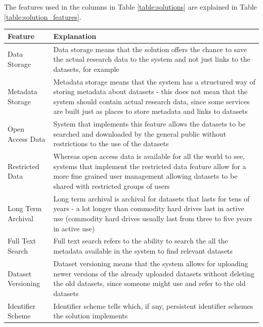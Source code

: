 The features used in the columns in Table \ref{table:solutions} are explained
in Table \ref{table:solution_features}.

\pagebreak

\addtocounter{table}{-1}
\label{table:solution_features}
    \begin{tabularx}{\textwidth}{| >{\raggedright}p{3cm} | X |}
    \hline
    \textbf{Feature} & \textbf{Explanation} \\
    \hline
    \rowcolor{Gray}
    Data Storage    & Data storage means that the solution offers the chance to
                      save the actual research data to the system and not just links
                      to the datasets, for example\\
    \hline
    Metadata Storage &  Metadata storage means that the system has a structured way
                        of storing metadata about datasets - this does not mean that
                        the system should contain actual research data, since some services
                        are built just as places to store metadata and links to datasets\\
    \hline
    \rowcolor{Gray}
    Open Access Data    & System that implements this feature allows the datasets to be searched
                          and downloaded by the general public without restrictions to the use
                          of the datasets\\
    \hline
    Restricted Data    & Whereas open access data is available for all the world to see, systems
                         that implement the restricted data feature allow for a more fine grained
                         user management allowing datasets to be shared with restricted groups
                         of users\\
    \hline
    \rowcolor{Gray}
    Long Term Archival    & Long term archival is archival for datasets that lasts for tens of years -
                            a lot longer than commodity hard drives last in active use (commodity
                            hard drives usually last from three to five years in active use)\\
    \hline
    Full Text Search    & Full text search refers to the ability to search the all the metadata
                          available in the system to find relevant datasets\\
    \hline
    \rowcolor{Gray}
    Dataset Versioning    & Dataset versioning means that the system allows for uploading newer versions
                           of the already uploaded datasets without deleting the old datasets, since
                           someone might use and refer to the old datasets\\
    \hline
    Identifier Scheme    & Identifier scheme tells which, if any, persistent identifier schemes the
                           solution implements\\
    \hline
\end{tabularx}

